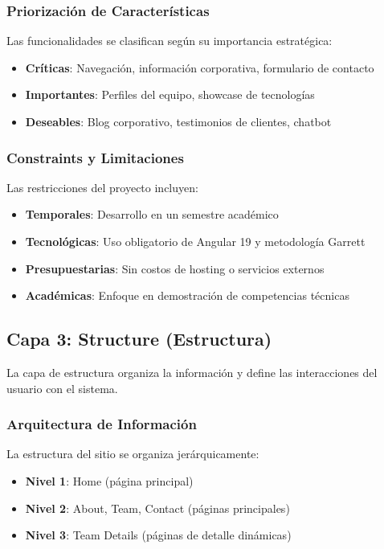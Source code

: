 \subsubsection{Priorización de Características}
Las funcionalidades se clasifican según su importancia estratégica:

\begin{itemize}
    \item \textbf{Críticas}: Navegación, información corporativa, formulario de contacto
    \item \textbf{Importantes}: Perfiles del equipo, showcase de tecnologías
    \item \textbf{Deseables}: Blog corporativo, testimonios de clientes, chatbot
\end{itemize}

\subsubsection{Constraints y Limitaciones}
Las restricciones del proyecto incluyen:

\begin{itemize}
    \item \textbf{Temporales}: Desarrollo en un semestre académico
    \item \textbf{Tecnológicas}: Uso obligatorio de Angular 19 y metodología Garrett
    \item \textbf{Presupuestarias}: Sin costos de hosting o servicios externos
    \item \textbf{Académicas}: Enfoque en demostración de competencias técnicas
\end{itemize}

\subsection{Capa 3: Structure (Estructura)}

La capa de estructura organiza la información y define las interacciones del usuario con el sistema.

\subsubsection{Arquitectura de Información}
La estructura del sitio se organiza jerárquicamente:

\begin{itemize}
    \item \textbf{Nivel 1}: Home (página principal)
    \item \textbf{Nivel 2}: About, Team, Contact (páginas principales)
    \item \textbf{Nivel 3}: Team Details (páginas de detalle dinámicas)
\end{itemize}


